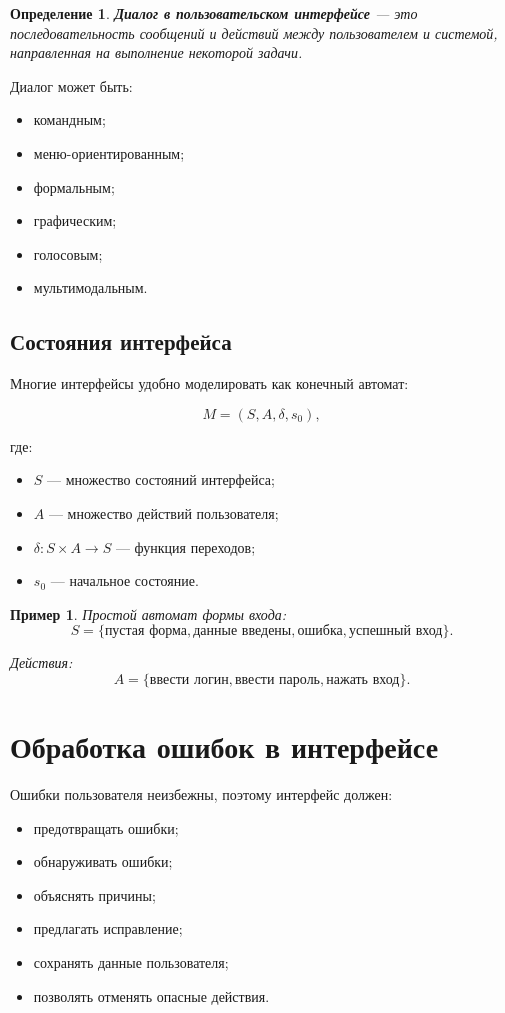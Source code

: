\documentclass[12pt,a4paper]{article}
\newtheorem{definition}{Определение}
\newtheorem{example}{Пример}
\begin{document}
\begin{definition}
\textbf{Диалог в пользовательском интерфейсе} --- это последовательность сообщений и действий между пользователем и системой, направленная на выполнение некоторой задачи.
\end{definition}

Диалог может быть:
\begin{itemize}
    \item командным;
    \item меню-ориентированным;
    \item формальным;
    \item графическим;
    \item голосовым;
    \item мультимодальным.
\end{itemize}

\subsection{Состояния интерфейса}

Многие интерфейсы удобно моделировать как конечный автомат:

\[
M = (S, A, \delta, s_0),
\]

где:
\begin{itemize}
    \item $S$ --- множество состояний интерфейса;
    \item $A$ --- множество действий пользователя;
    \item $\delta: S \times A \rightarrow S$ --- функция переходов;
    \item $s_0$ --- начальное состояние.
\end{itemize}

\begin{example}
Простой автомат формы входа:
\[
S = \{\text{пустая форма}, \text{данные введены}, \text{ошибка}, \text{успешный вход}\}.
\]

Действия:
\[
A = \{\text{ввести логин}, \text{ввести пароль}, \text{нажать вход}\}.
\]
\end{example}

\section{Обработка ошибок в интерфейсе}

Ошибки пользователя неизбежны, поэтому интерфейс должен:
\begin{itemize}
    \item предотвращать ошибки;
    \item обнаруживать ошибки;
    \item объяснять причины;
    \item предлагать исправление;
    \item сохранять данные пользователя;
    \item позволять отменять опасные действия.
\end{itemize}
\end{document}
